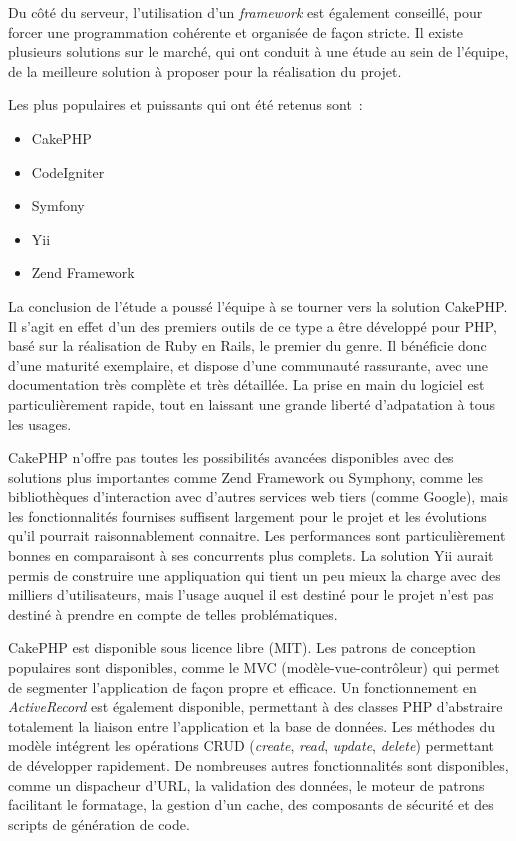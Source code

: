 Du côté du serveur, l'utilisation d'un \textit{framework} est également conseillé, pour forcer une programmation cohérente et organisée de façon stricte. Il existe plusieurs solutions sur le marché, qui ont conduit à une étude au sein de l'équipe, de la meilleure solution à proposer pour la réalisation du projet.

Les plus populaires et puissants qui ont été retenus sont~:

\begin{itemize}
\item CakePHP
\item CodeIgniter
\item Symfony
\item Yii
\item Zend Framework
\end{itemize}

La conclusion de l'étude a poussé l'équipe à se tourner vers la solution CakePHP. Il s'agit en effet d'un des premiers outils de ce type a être développé pour PHP, basé sur la réalisation de Ruby en Rails, le premier du genre. Il bénéficie donc d'une maturité exemplaire, et dispose d'une communauté rassurante, avec une documentation très complète et très détaillée. La prise en main du logiciel est particulièrement rapide, tout en laissant une grande liberté d'adpatation à tous les usages.

CakePHP n'offre pas toutes les possibilités avancées disponibles avec des solutions plus importantes comme Zend Framework ou Symphony, comme les bibliothèques d'interaction avec d'autres services web tiers (comme Google), mais les fonctionnalités fournises suffisent largement pour le projet et les évolutions qu'il pourrait raisonnablement connaitre. Les performances sont particulièrement bonnes en comparaisont à ses concurrents plus complets. La solution Yii aurait permis de construire une appliquation qui tient un peu mieux la charge avec des milliers d'utilisateurs, mais l'usage auquel il est destiné pour le projet n'est pas destiné à prendre en compte de telles problématiques.

CakePHP est disponible sous licence libre (MIT). Les patrons de conception populaires sont disponibles, comme le MVC (modèle-vue-contrôleur) qui permet de segmenter l'application de façon propre et efficace. Un fonctionnement en \textit{ActiveRecord} est également disponible, permettant à des classes PHP d'abstraire totalement la liaison entre l'application et la base de données. Les méthodes du modèle intégrent les opérations CRUD (\textit{create}, \textit{read}, \textit{update}, \textit{delete}) permettant de développer rapidement. De nombreuses autres fonctionnalités sont disponibles, comme un dispacheur d'URL, la validation des données, le moteur de patrons facilitant le formatage, la gestion d'un cache, des composants de sécurité et des scripts de génération de code.


